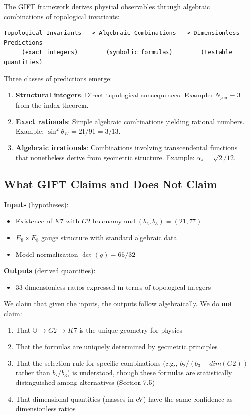 \documentclass[11pt,a4paper]{article}
\newcommand{\E}{\mathrm{E}}
\newcommand{\Gtwo}{\mathrm{G}_2}
\newcommand{\Kseven}{K_7}
\newcommand{\dimE}{\mathrm{dim}}
\def\Gtwo{G2}%
\def\Kseven{K7}%
\def\E{E}%
\def\dimE{dim}%
\begin{document}
The GIFT framework derives physical observables through algebraic combinations of topological invariants:

\begin{lstlisting}
Topological Invariants --> Algebraic Combinations --> Dimensionless Predictions
     (exact integers)        (symbolic formulas)        (testable quantities)
\end{lstlisting}

Three classes of predictions emerge:

\begin{enumerate}
\item \textbf{Structural integers}: Direct topological consequences. Example: $N_{\mathrm{gen}} = 3$ from the index theorem.
\item \textbf{Exact rationals}: Simple algebraic combinations yielding rational numbers. Example: $\sin^2\theta_W = 21/91 = 3/13$.
\item \textbf{Algebraic irrationals}: Combinations involving transcendental functions that nonetheless derive from geometric structure. Example: $\alpha_s = \sqrt{2}/12$.
\end{enumerate}

\subsection{What GIFT Claims and Does Not Claim}

\textbf{Inputs} (hypotheses):
\begin{itemize}
\item Existence of $\Kseven$ with $\Gtwo$ holonomy and $(b_2, b_3) = (21, 77)$
\item $\E_8 \times \E_8$ gauge structure with standard algebraic data
\item Model normalization $\det(g) = 65/32$
\end{itemize}

\textbf{Outputs} (derived quantities):
\begin{itemize}
\item 33 dimensionless ratios expressed in terms of topological integers
\end{itemize}

We claim that given the inputs, the outputs follow algebraically. We do \textbf{not} claim:
\begin{enumerate}
\item That $\mathbb{O} \to \Gtwo \to \Kseven$ is the unique geometry for physics
\item That the formulas are uniquely determined by geometric principles
\item That the selection rule for specific combinations (e.g., $b_2/(b_3 + \dimE(\Gtwo))$ rather than $b_2/b_3$) is understood, though these formulas are statistically distinguished among alternatives (Section 7.5)
\item That dimensional quantities (masses in eV) have the same confidence as dimensionless ratios
\end{enumerate}
\end{document}
